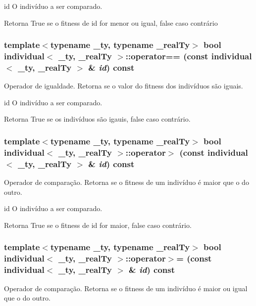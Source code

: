 id O indivíduo a ser comparado.

\begin{DoxyReturn}{Retorna}
True se o fitness de id for menor ou igual, false caso contrário 
\end{DoxyReturn}
\hypertarget{classindividual_aec35be09dd951d52d794adf07f18f555}{
\subsubsection[{operator==}]{\setlength{\rightskip}{0pt plus 5cm}template$<$typename \_\-ty, typename \_\-realTy$>$ bool {\bf individual}$<$ \_\-ty, \_\-realTy $>$::operator== (const {\bf individual}$<$ \_\-ty, \_\-realTy $>$ \& {\em id}) const}}
\label{classindividual_aec35be09dd951d52d794adf07f18f555}
Operador de igualdade. Retorna se o valor do fitness dos indivíduos são iguais.

id O indivíduo a ser comparado.

\begin{DoxyReturn}{Retorna}
True se os indivíduos são igauis, false caso contrário. 
\end{DoxyReturn}
\hypertarget{classindividual_a059f721458f46910431c30d5c7f8b83d}{
\subsubsection[{operator$>$}]{\setlength{\rightskip}{0pt plus 5cm}template$<$typename \_\-ty, typename \_\-realTy$>$ bool {\bf individual}$<$ \_\-ty, \_\-realTy $>$::operator$>$ (const {\bf individual}$<$ \_\-ty, \_\-realTy $>$ \& {\em id}) const}}
\label{classindividual_a059f721458f46910431c30d5c7f8b83d}
Operador de comparação. Retorna se o fitness de um indivíduo é maior que o do outro.

id O indivíduo a ser comparado.

\begin{DoxyReturn}{Retorna}
True se o fitness de id for maior, false caso contrário. 
\end{DoxyReturn}
\hypertarget{classindividual_a2116152c25706d6e5eef761f8b516cbe}{
\subsubsection[{operator$>$=}]{\setlength{\rightskip}{0pt plus 5cm}template$<$typename \_\-ty, typename \_\-realTy$>$ bool {\bf individual}$<$ \_\-ty, \_\-realTy $>$::operator$>$= (const {\bf individual}$<$ \_\-ty, \_\-realTy $>$ \& {\em id}) const}}
\label{classindividual_a2116152c25706d6e5eef761f8b516cbe}
Operador de comparação. Retorna se o fitness de um indivíduo é maior ou igual que o do outro.

